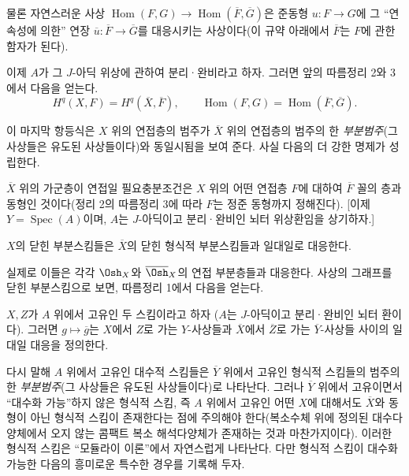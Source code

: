 물론 자연스러운 사상
$\operatorname{Hom}(F,G)\longrightarrow
\operatorname{Hom}(\overline F,\overline G)$은 준동형
$u:F\longrightarrow G$에 그 ``연속성에 의한'' 연장
$\overline u:\overline F\longrightarrow\overline G$를 대응시키는
사상이다(이 규약 아래에서 $\overline F$는 $F$에 관한 함자가 된다).

이제 $A$가 그 $J$-아딕 위상에 관하여 분리·완비라고 하자. 그러면 앞의
따름정리 2와 3에서 다음을 얻는다.
\[
  H^{q}(X,F)=H^{q}(\overline X,\overline F),
  \qquad
  \operatorname{Hom}(F,G)
  =\operatorname{Hom}(\overline F,\overline G).
\]

이 마지막 항등식은 $X$ 위의 연접층의 범주가 $\overline X$ 위의 연접층의
범주의 한 \emph{부분범주}(그 사상들은 유도된 사상들이다)와 동일시됨을
보여 준다. 사실 다음의 더 강한 명제가 성립한다.

 $\overline X$ 위의 가군층이 연접일 필요충분조건은
$X$ 위의 어떤 연접층 $F$에 대하여 $\overline F$ 꼴의 층과 동형인
것이다(정리 2의 따름정리 3에 따라 $F$는 정준 동형까지 정해진다).
[이제 $Y=\operatorname{Spec}(A)$이며, $A$는 $J$-아딕이고 분리·완비인
뇌터 위상환임을 상기하자.]

 $X$의 닫힌 부분스킴들은 $\overline X$의 닫힌 형식적
부분스킴들과 일대일로 대응한다.

실제로 이들은 각각 $\Osh_X$와 $\overline{\Osh}_X$의 연접 부분층들과
대응한다. 사상의 그래프를 닫힌 부분스킴으로 보면, 따름정리 1에서 다음을
얻는다.

 $X,Z$가 $A$ 위에서 고유인 두 스킴이라고 하자
($A$는 $J$-아딕이고 분리·완비인 뇌터 환이다). 그러면
$g\longmapsto\overline g$는 $X$에서 $Z$로 가는 $Y$-사상들과
$\overline X$에서 $\overline Z$로 가는 $\overline Y$-사상들 사이의
일대일 대응을 정의한다.

다시 말해 $A$ 위에서 고유인 대수적 스킴들은 $\overline Y$ 위에서 고유인
형식적 스킴들의 범주의 한 \emph{부분범주}(그 사상들은 유도된 사상들이다)로
나타난다. 그러나 $\overline Y$ 위에서 고유이면서 ``대수화 가능''하지
않은 형식적 스킴, 즉 $A$ 위에서 고유인 어떤 $X$에 대해서도 $\overline X$와
동형이 아닌 형식적 스킴이 존재한다는 점에 주의해야 한다(복소수체 위에
정의된 대수다양체에서 오지 않는 콤팩트 복소 해석다양체가 존재하는 것과
마찬가지이다). 이러한 형식적 스킴은 ``모듈라이 이론''에서 자연스럽게
나타난다. 다만 형식적 스킴이 대수화 가능한 다음의 흥미로운 특수한 경우를
기록해 두자.

